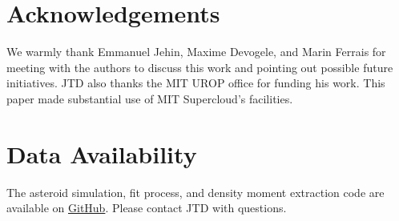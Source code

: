 \documentclass[fleqn,usenatbib]{mnras}
\begin{document}
\section*{Acknowledgements}

We warmly thank Emmanuel Jehin, Maxime Devogele, and Marin Ferrais for meeting with the authors to discuss this work and pointing out possible future initiatives. JTD also thanks the MIT UROP office for funding his work. This paper made substantial use of MIT Supercloud's facilities.



\section*{Data Availability}

The asteroid simulation, fit process, and density moment extraction code are available on \href{https://github.com/jack-dinsmore/asteroid-tidal-torque}{GitHub}. Please contact JTD with questions.












\bsp	%
\label{lastpage}
\end{document}
